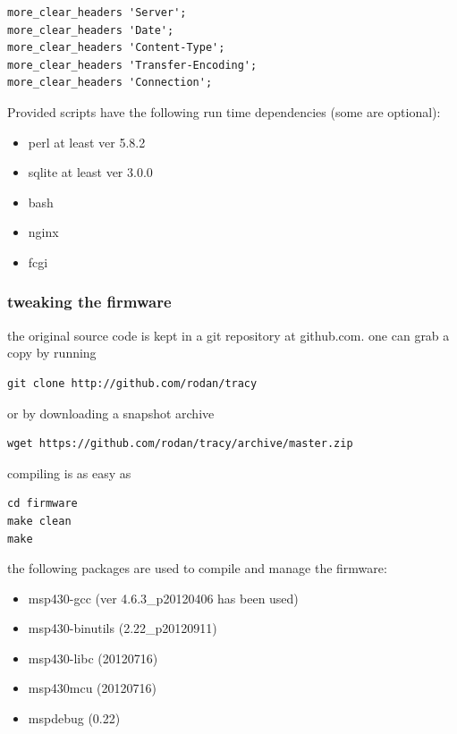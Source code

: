 \documentclass[a4paper,twoside]{refart}
\begin{document}
\begin{lstlisting}
more_clear_headers 'Server';
more_clear_headers 'Date';
more_clear_headers 'Content-Type';
more_clear_headers 'Transfer-Encoding';
more_clear_headers 'Connection';
\end{lstlisting}

Provided scripts have the following run time dependencies (some are optional):

\begin{itemize}
    \item perl at least ver 5.8.2
    \item sqlite at least ver 3.0.0
    \item bash
    \item nginx
    \item fcgi
\end{itemize}

\subsubsection{tweaking the firmware}

the original source code is kept in a git repository at github.com.
one can grab a copy by running

\begin{lstlisting}
git clone http://github.com/rodan/tracy
\end{lstlisting} 

or by downloading a snapshot archive

\begin{lstlisting}
wget https://github.com/rodan/tracy/archive/master.zip
\end{lstlisting} 

compiling is as easy as
\begin{lstlisting}
cd firmware
make clean
make
\end{lstlisting} 

the following packages are used to compile and manage the firmware:

\begin{itemize}
    \item msp430-gcc (ver 4.6.3\_p20120406 has been used)
    \item msp430-binutils (2.22\_p20120911)
    \item msp430-libc (20120716)
    \item msp430mcu (20120716)
    \item mspdebug (0.22)
\end{itemize}
\end{document}
